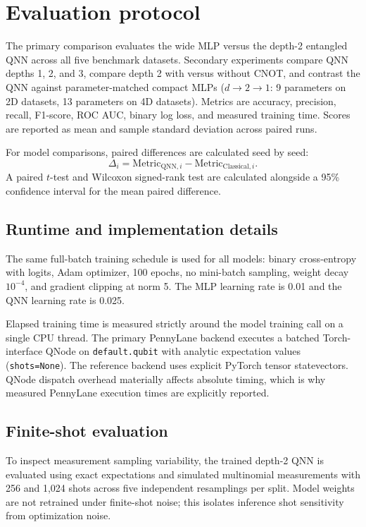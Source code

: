 \section{Evaluation protocol}
The primary comparison evaluates the wide MLP versus the depth-2 entangled QNN across all five benchmark datasets. Secondary experiments compare QNN depths 1, 2, and 3, compare depth 2 with versus without CNOT, and contrast the QNN against parameter-matched compact MLPs ($d\to2\to1$: 9 parameters on 2D datasets, 13 parameters on 4D datasets). Metrics are accuracy, precision, recall, F1-score, ROC AUC, binary log loss, and measured training time. Scores are reported as mean and sample standard deviation across paired runs.

For model comparisons, paired differences are calculated seed by seed:
\begin{equation}
  \Delta_i = \text{Metric}_{\text{QNN}, i} - \text{Metric}_{\text{Classical}, i}.
\end{equation}
A paired $t$-test and Wilcoxon signed-rank test are calculated alongside a 95\% confidence interval for the mean paired difference.

\subsection{Runtime and implementation details}
The same full-batch training schedule is used for all models: binary cross-entropy with logits, Adam optimizer, 100 epochs, no mini-batch sampling, weight decay $10^{-4}$, and gradient clipping at norm 5. The MLP learning rate is 0.01 and the QNN learning rate is 0.025.

Elapsed training time is measured strictly around the model training call on a single CPU thread. The primary PennyLane backend executes a batched Torch-interface QNode on \texttt{default.qubit} with analytic expectation values (\texttt{shots=None}). The reference backend uses explicit PyTorch tensor statevectors. QNode dispatch overhead materially affects absolute timing, which is why measured PennyLane execution times are explicitly reported.

\subsection{Finite-shot evaluation}
To inspect measurement sampling variability, the trained depth-2 QNN is evaluated using exact expectations and simulated multinomial measurements with 256 and 1,024 shots across five independent resamplings per split. Model weights are not retrained under finite-shot noise; this isolates inference shot sensitivity from optimization noise.

